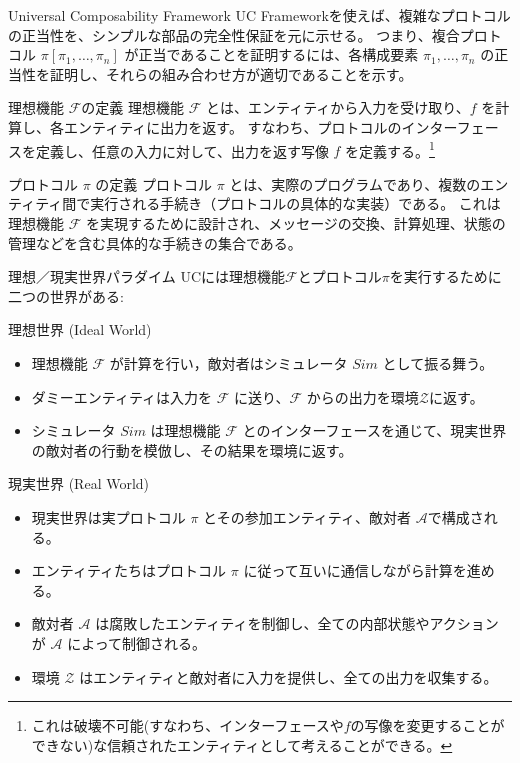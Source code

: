 \documentclass[aspectratio=169,10pt]{beamer}
\newenvironment{proofblock}[1][]
{\begin{block}{#1}\vspace{0.5em}}
{\vspace{0.5em}\end{block}}
\begin{document}
\begin{frame}{Universal Composability Framework}
UC Frameworkを使えば、複雑なプロトコルの正当性を、シンプルな部品の完全性保証を元に示せる。
つまり、複合プロトコル $\pi[\pi_1,\dots,\pi_n]$ が正当であることを証明するには、各構成要素 $\pi_1,\dots,\pi_n$ の正当性を証明し、それらの組み合わせ方が適切であることを示す。

  \begin{proofblock}[理想機能 $\mathcal{F}$の定義]
    理想機能 $\mathcal{F}$ とは、エンティティから入力を受け取り、$f$ を計算し、各エンティティに出力を返す。
    すなわち、プロトコルのインターフェースを定義し、任意の入力に対して、出力を返す写像 $f$ を定義する。\footnote{これは破壊不可能(すなわち、インターフェースや$f$の写像を変更することができない)な信頼されたエンティティとして考えることができる。}
  \end{proofblock}

  \begin{proofblock}[プロトコル $\pi$ の定義]
    プロトコル $\pi$ とは、実際のプログラムであり、複数のエンティティ間で実行される手続き（プロトコルの具体的な実装）である。
    これは理想機能 $\mathcal{F}$ を実現するために設計され、メッセージの交換、計算処理、状態の管理などを含む具体的な手続きの集合である。
  \end{proofblock}
\end{frame}

\begin{frame}{理想／現実世界パラダイム}
    UCには理想機能$\mathcal{F}$とプロトコル$\pi$を実行するために二つの世界がある:

    \begin{proofblock}[理想世界 (Ideal World)]
    \begin{itemize}
      \item 理想機能 $\mathcal{F}$ が計算を行い，敵対者はシミュレータ $Sim$ として振る舞う。
      \item ダミーエンティティは入力を $\mathcal{F}$ に送り、$\mathcal{F}$ からの出力を環境$\mathcal{Z}$に返す。
      \item シミュレータ $Sim$ は理想機能 $\mathcal{F}$ とのインターフェースを通じて、現実世界の敵対者の行動を模倣し、その結果を環境に返す。
    \end{itemize}
  \end{proofblock}


  \begin{proofblock}[現実世界 (Real World)]
    \begin{itemize}
      \item 現実世界は実プロトコル $\pi$ とその参加エンティティ、敵対者 $\mathcal{A}$で構成される。
      \item エンティティたちはプロトコル $\pi$ に従って互いに通信しながら計算を進める。
      \item 敵対者 $\mathcal{A}$ は腐敗したエンティティを制御し、全ての内部状態やアクションが $\mathcal{A}$ によって制御される。
      \item 環境 $\mathcal{Z}$ はエンティティと敵対者に入力を提供し、全ての出力を収集する。
    \end{itemize}
  \end{proofblock}
\end{frame}
\end{document}
